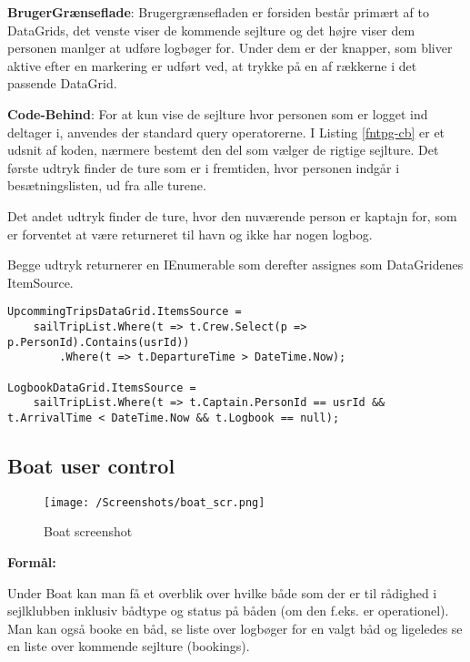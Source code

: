 \textbf{BrugerGrænseflade}: 
Brugergrænsefladen er forsiden består primært af to DataGrids, det venste viser de kommende sejlture og det højre viser dem personen manlger at udføre logbøger for. 
Under dem er der knapper, som bliver aktive efter en markering er udført ved, at trykke på en af rækkerne i det passende DataGrid.

\textbf{Code-Behind}: 
For at kun vise de sejlture hvor personen som er logget ind deltager i, anvendes der standard query operatorerne. 
I Listing \ref{fntpg-cb} er et udsnit af koden, nærmere bestemt den del som vælger de rigtige sejlture.
Det første udtryk finder de ture som er i fremtiden, hvor personen indgår i besætningslisten, ud fra alle turene.

Det andet udtryk finder de ture, hvor den nuværende person er kaptajn for, som er forventet at være returneret til havn og ikke har nogen logbog. 

Begge udtryk returnerer en IEnumerable som derefter assignes som DataGridenes ItemSource.

\begin{lstlisting}[frame=single, caption=Forsidens Code-Behind, label=fntpg-cb]
UpcommingTripsDataGrid.ItemsSource =
    sailTripList.Where(t => t.Crew.Select(p => p.PersonId).Contains(usrId))
        .Where(t => t.DepartureTime > DateTime.Now);

LogbookDataGrid.ItemsSource =
    sailTripList.Where(t => t.Captain.PersonId == usrId && t.ArrivalTime < DateTime.Now && t.Logbook == null);
\end{lstlisting}

\subsection{Boat user control}

\begin{wrapfigure}{l}{0.5\textwidth}
    \label{img:boat_scr}
    \vspace{-20pt}
    \begin{center}
        \texttt{[image: /Screenshots/boat\_scr.png]}
    \end{center}
    \vspace{-20pt}
    \caption{Boat screenshot}
    \vspace{-10pt}
\end{wrapfigure}

\textbf{Formål:}

Under Boat kan man få et overblik over hvilke både som der er til rådighed i sejlklubben inklusiv bådtype og status på båden (om den f.eks. er operationel). 
Man kan også booke en båd, se liste over logbøger for en valgt båd og ligeledes se en liste over kommende sejlture (bookings). 

